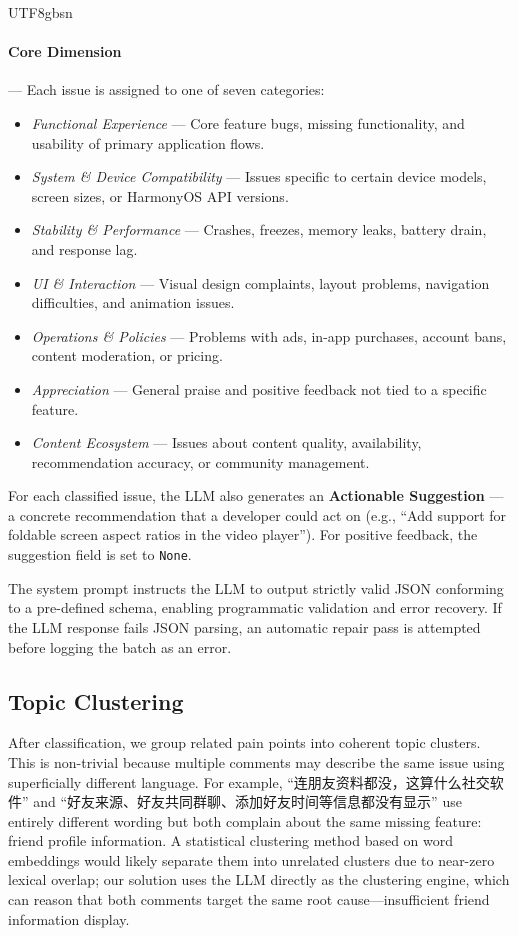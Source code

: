 \documentclass[11pt,a4paper]{article}
\begin{document}
\begin{CJK*}{UTF8}{gbsn}
\paragraph{Core Dimension} --- Each issue is assigned to one of seven categories:
\begin{itemize}[nosep]
  \item \textit{Functional Experience} --- Core feature bugs, missing functionality, and usability of primary application flows.
  \item \textit{System \& Device Compatibility} --- Issues specific to certain device models, screen sizes, or HarmonyOS API versions.
  \item \textit{Stability \& Performance} --- Crashes, freezes, memory leaks, battery drain, and response lag.
  \item \textit{UI \& Interaction} --- Visual design complaints, layout problems, navigation difficulties, and animation issues.
  \item \textit{Operations \& Policies} --- Problems with ads, in-app purchases, account bans, content moderation, or pricing.
  \item \textit{Appreciation} --- General praise and positive feedback not tied to a specific feature.
  \item \textit{Content Ecosystem} --- Issues about content quality, availability, recommendation accuracy, or community management.
\end{itemize}

For each classified issue, the LLM also generates an \textbf{Actionable Suggestion} --- a concrete recommendation that a developer could act on (e.g., ``Add support for foldable screen aspect ratios in the video player''). For positive feedback, the suggestion field is set to \texttt{None}.

The system prompt instructs the LLM to output strictly valid JSON conforming to a pre-defined schema, enabling programmatic validation and error recovery. If the LLM response fails JSON parsing, an automatic repair pass is attempted before logging the batch as an error.

\subsection{Topic Clustering}

After classification, we group related pain points into coherent topic clusters. This is non-trivial because multiple comments may describe the same issue using superficially different language. For example, ``连朋友资料都没，这算什么社交软件'' and ``好友来源、好友共同群聊、添加好友时间等信息都没有显示'' use entirely different wording but both complain about the same missing feature: friend profile information. A statistical clustering method based on word embeddings would likely separate them into unrelated clusters due to near-zero lexical overlap; our solution uses the LLM directly as the clustering engine, which can reason that both comments target the same root cause---insufficient friend information display.


\end{CJK*}
\end{document}
